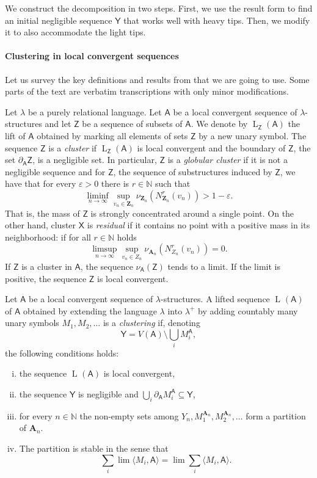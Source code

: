 \documentclass[11pt]{article}
\theoremstyle{plain}
\theoremstyle{definition}
\theoremstyle{remark}
\newcommand{\N}{\mathbb{N}}
\newcommand{\stonepar}[2]{\langle #1, #2 \rangle}
\newcommand{\str}[1]{\mathbf{#1}}
\newcommand{\strseq}[1]{{\boldsymbol{\mathsf{#1}}}}
\newcommand{\seq}[1]{{\mathsf{#1}}}
\newcommand{\eps}{\varepsilon}
\DeclareMathOperator{\liftsym}{L}
\newcommand{\lift}[2]{\liftsym_{#1}({#2})}
\begin{document}
We construct the decomposition in two steps.
First, we use the result form \cite{clustering} to find an initial negligible sequence $\seq{Y}$ that works well with heavy tips.
Then, we modify it to also accommodate the light tips.

\paragraph{Clustering in local convergent sequences}\label{par:clustering_in_local_convergent_sequences}

Let us survey the key definitions and results from \cite{clustering} that we are going to use.
Some parts of the text are verbatim transcriptions with only minor modifications.

Let $\lambda$ be a purely relational language.
Let $\strseq{A}$ be a local convergent sequence of $\lambda$-structures and let $\seq{Z}$ be a sequence of subsets of $\strseq{A}$.
We denote by $\lift{\seq{Z}}{\strseq{A}}$ the lift of $\strseq{A}$ obtained by marking all elements of sets $\seq{Z}$ by a new unary symbol.
The sequence $\seq{Z}$ is a \emph{cluster} if $\lift{\seq{Z}}{\strseq{A}}$ is local convergent and the boundary of $\seq{Z}$, the set $\partial_\strseq{A} \seq{Z}$, is a negligible set.
In particular, $\seq{Z}$ is a \emph{globular cluster} if it is not a negligible sequence and for $\strseq{Z}$, the sequence of substructures induced by $\seq{Z}$, we have that for every $\eps > 0$ there is $r \in \N$ such that
\[
    \liminf_{n \to \infty} \sup_{v_n \in \str{Z}_n} \nu_{\str{Z}_n}(N^r_{\str{Z}_n}(v_n)) > 1-\eps
    .
\]
That is, the mass of $\seq{Z}$ is strongly concentrated around a single point.
On the other hand, cluster $\seq{X}$ is \emph{residual} if it contains no point with a positive mass in its neighborhood: 
if for all $r \in \N$ holds
\[
    \limsup_{n \to \infty} \sup_{v_n \in Z_n} \nu_{\str{A}_n}(N^r_{Z_n}(v_n)) = 0
    .
\]
If $\seq{Z}$ is a cluster in $\strseq{A}$, the sequence $\nu_\strseq{A}(\seq{Z})$ tends to a limit.
If the limit is positive, the sequence $\strseq{Z}$ is local convergent.

Let $\strseq{A}$ be a local convergent sequence of $\lambda$-structures.
A lifted sequence $\lift{}{\strseq{A}}$ of $\strseq{A}$ obtained by extending the language $\lambda$ into $\lambda^+$ by adding countably many unary symbols $M_1, M_2, \dots$ is a \emph{clustering} if, denoting
\[
    \seq{Y} = V(\strseq{A}) \setminus \bigcup_i M_i^\strseq{A}
    ,
\]
the following conditions holds:
\begin{enumerate}[(i)]
    \item the sequence $\lift{}{\strseq{A}}$ is local convergent,
    \item the sequence $\seq{Y}$ is negligible and $\bigcup_i \partial_\strseq{A} M_i^\strseq{A} \subseteq \seq{Y}$,
    \item for every $n \in \N$ the non-empty sets among $Y_n, M_1^{\str{A}_n}, M_2^{\str{A}_n}, \dots$ form a partition of $\str{A}_n$.
    \item The partition is stable in the sense that
    \[
        \sum_i \lim \stonepar{M_i}{\strseq{A}} = \lim \sum_i \stonepar{M_i}{\strseq{A}}
        .
    \]
\end{enumerate}
\end{document}

